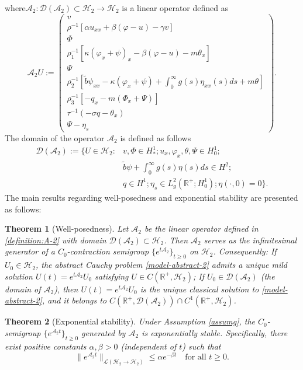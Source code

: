 \documentclass[11pt,reqno]{article}
\newtheorem{theorem}{Theorem}[section] %
\newcommand{\dt}{\tilde}
\begin{document}
where$\mathcal{A}_2: \mathcal{D}(\mathcal{A}_2) \subset \mathcal{H}_2 \to \mathcal{H}_2$ is a linear operator defined as  \begin{equation}\label{definition:A-2}
	\mathcal{A}_2 U := \begin{pmatrix}
		v \\
		\rho^{-1} \left[ \alpha u_{xx} + \beta (\varphi - u) - \gamma v \right] \\
		\Phi \\
		\rho_1^{-1} \left[ \kappa (\varphi_x + \psi)_x - \beta (\varphi - u) - m \theta_x \right] \\
		\Psi \\
		\rho_2^{-1} \left[ \dt b \psi_{xx} - \kappa (\varphi_x + \psi) + \int_0^\infty g(s) \eta_{xx}(s) ds + m\theta \right] \\
		\rho_3^{-1} \left[ -q_x - m (\Phi_x + \Psi) \right] \\
		\tau^{-1}(-\sigma q - \theta_x) \\
		\Psi - \eta_s
	\end{pmatrix}.
\end{equation}
The domain of the operator $\mathcal{A}_2$ is defined as follows
\begin{align*}
	\mathcal{D}(\mathcal{A}_2) := \bigg\{ U \in \mathcal{H}_2 :&
	v, \Phi \in H_*^1;  u_x, \varphi_x, \theta, \Psi \in H_0^1; \\
	&\dt b \psi + \int_0^\infty g(s)\eta(s)ds \in H^2; \\
	&q \in H^1;
	\eta_s \in L_g^2(\mathbb{R}^+; H_0^1) ; \eta(\cdot, 0) = 0
	\bigg\}.
\end{align*}
The main results regarding well-posedness and exponential stability are presented as follows:
\begin{theorem}[Well-posedness]\label{Well-Posedness-2}
	Let \(\mathcal{A}_2\) be the linear operator defined in \eqref{definition:A-2} with domain \(\mathcal{D}(\mathcal{A}_2) \subset \mathcal{H}_2\). Then \(\mathcal{A}_2\) serves as the infinitesimal generator of a \(C_0\)-contraction semigroup \(\{e^{t\mathcal{A}_2}\}_{t \ge 0}\) on \(\mathcal{H}_2\). Consequently:
        If \(U_0 \in \mathcal{H}_2\), the abstract Cauchy problem \eqref{model-abstract-2} admits a unique mild solution \(U(t) = e^{t\mathcal{A}_2}U_0\) satisfying \(U \in C(\mathbb{R}^+, \mathcal{H}_2)\); If \(U_0 \in \mathcal{D}(\mathcal{A}_2)\) (the domain of \(\mathcal{A}_2\)), then \(U(t) = e^{t\mathcal{A}_2}U_0\) is the unique classical solution to \eqref{model-abstract-2}, and it belongs to \(C(\mathbb{R}^+, \mathcal{D}(\mathcal{A}_2)) \cap C^1(\mathbb{R}^+, \mathcal{H}_2)\).
\end{theorem}
\begin{theorem}[Exponential stability]\label{exponential stability}
	 Under Assumption \ref{assumg}, the \(C_0\)-semigroup \(\{e^{\mathcal{A}_2 t}\}_{t \geq 0}\) generated by \(\mathcal{A}_2\) is exponentially stable. Specifically, there exist positive constants \(\alpha, \beta > 0\) (independent of \(t\)) such that
        \[
        \|e^{\mathcal{A}_2 t}\|_{\mathcal{L}(\mathcal{H}_2 \to \mathcal{H}_2)} \leq \alpha e^{-\beta t} \quad \text{for all } t \ge 0.
        \]
\end{theorem}
\end{document}
